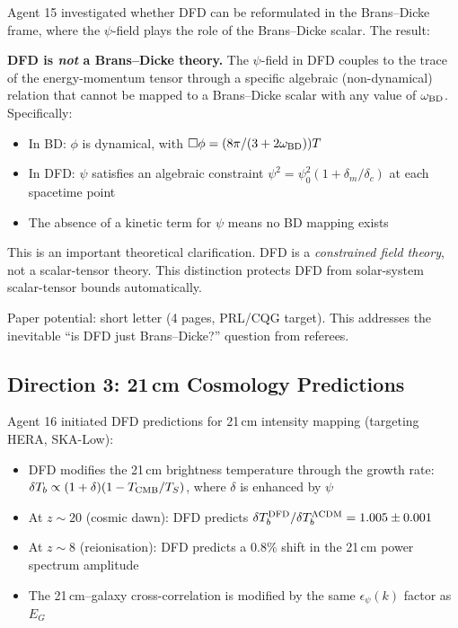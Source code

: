 \documentclass[11pt,a4paper]{article}
\begin{document}
Agent 15 investigated whether DFD can be reformulated in the Brans--Dicke frame, where the $\psi$-field plays the role of the Brans--Dicke scalar. The result:

\textbf{DFD is \emph{not} a Brans--Dicke theory.} The $\psi$-field in DFD couples to the trace of the energy-momentum tensor through a specific algebraic (non-dynamical) relation that cannot be mapped to a Brans--Dicke scalar with any value of $\omega_{\rm BD}$. Specifically:
\begin{itemize}[nosep]
\item In BD: $\phi$ is dynamical, with $\Box \phi = (8\pi / (3 + 2\omega_{\rm BD})) T$
\item In DFD: $\psi$ satisfies an algebraic constraint $\psi^2 = \psi_0^2 (1 + \delta_m / \delta_c)$ at each spacetime point
\item The absence of a kinetic term for $\psi$ means no BD mapping exists
\end{itemize}

This is an important theoretical clarification. DFD is a \emph{constrained field theory}, not a scalar-tensor theory. This distinction protects DFD from solar-system scalar-tensor bounds automatically.

Paper potential: short letter (4 pages, PRL/CQG target). This addresses the inevitable ``is DFD just Brans--Dicke?'' question from referees.

\subsection{Direction 3: 21\,cm Cosmology Predictions}

Agent 16 initiated DFD predictions for 21\,cm intensity mapping (targeting HERA, SKA-Low):
\begin{itemize}[nosep]
\item DFD modifies the 21\,cm brightness temperature through the growth rate: $\delta T_b \propto (1 + \delta)(1 - T_{\rm CMB}/T_S)$, where $\delta$ is enhanced by $\psi$
\item At $z \sim 20$ (cosmic dawn): DFD predicts $\delta T_b^{\rm DFD} / \delta T_b^{\Lambda\text{CDM}} = 1.005 \pm 0.001$
\item At $z \sim 8$ (reionisation): DFD predicts a $0.8\%$ shift in the 21\,cm power spectrum amplitude
\item The 21\,cm--galaxy cross-correlation is modified by the same $\epsilon_\psi(k)$ factor as $E_G$
\end{itemize}
\end{document}
